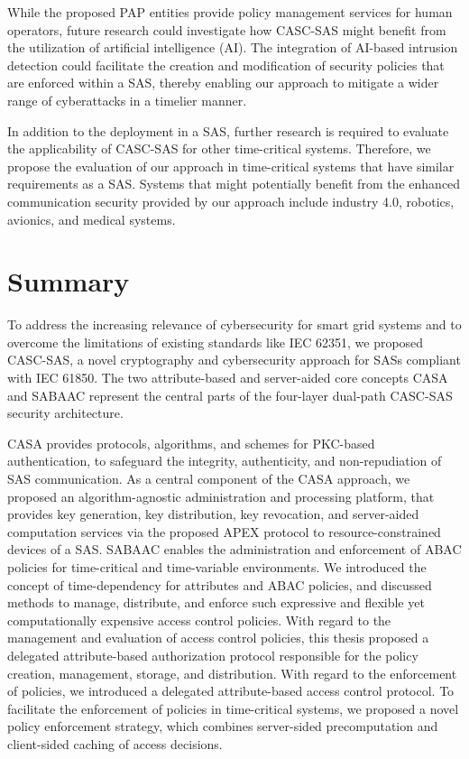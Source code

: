 While the proposed PAP entities provide policy management services for human operators, future research could investigate how CASC-SAS might benefit from the utilization of artificial intelligence (AI).
The integration of AI-based intrusion detection could facilitate the creation and modification of security policies that are enforced within a SAS, thereby enabling our approach to mitigate a wider range of cyberattacks in a timelier manner.

In addition to the deployment in a SAS, further research is required to evaluate the applicability of CASC-SAS for other time-critical systems.
Therefore, we propose the evaluation of our approach in time-critical systems that have similar requirements as a SAS.
Systems that might potentially benefit from the enhanced communication security provided by our approach include industry 4.0, robotics, avionics, and medical systems.

\section{Summary}
\label{sec:conclusion:summary}
To address the increasing relevance of cybersecurity for smart grid systems and to overcome the limitations of existing standards like IEC 62351, we proposed CASC-SAS, a novel cryptography and cybersecurity approach for SASs compliant with IEC 61850.
The two attribute-based and server-aided core concepts CASA and SABAAC represent the central parts of the four-layer dual-path CASC-SAS security architecture.

CASA provides protocols, algorithms, and schemes for PKC-based authentication, to safeguard the integrity, authenticity, and non-repudiation of SAS communication.
As a central component of the CASA approach, we proposed an algorithm-agnostic administration and processing platform, that provides key generation, key distribution, key revocation, and server-aided computation services via the proposed APEX protocol to resource-constrained devices of a SAS.
SABAAC enables the administration and enforcement of ABAC policies for time-critical and time-variable environments.
We introduced the concept of time-dependency for attributes and ABAC policies, and discussed methods to manage, distribute, and enforce such expressive and flexible yet computationally expensive access control policies.
With regard to the management and evaluation of access control policies, this thesis proposed a delegated attribute-based authorization protocol responsible for the policy creation, management, storage, and distribution.
With regard to the enforcement of policies, we introduced a delegated attribute-based access control protocol.
To facilitate the enforcement of policies in time-critical systems, we proposed a novel policy enforcement strategy, which combines server-sided precomputation and client-sided caching of access decisions.

